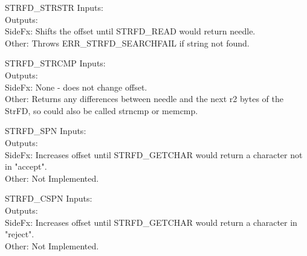 \begin{sccall}{STRFD\_STRSTR}
Inputs: \\
Outputs: \scargs{}\\
SideFx: Shifts the offset until STRFD\_READ would return needle.\\
Other: Throws ERR\_STRFD\_SEARCHFAIL if string not found.
\end{sccall}
\begin{sccall}{STRFD\_STRCMP}
Inputs: \\
Outputs: \\
SideFx: None - does not change offset.\\
Other: Returns any differences between needle and the next r2 bytes of the StrFD, so
could also be called strncmp or memcmp.
\end{sccall}
\begin{sccall}{STRFD\_SPN}
Inputs: \\
Outputs: \scargs{}\\
SideFx: Increases offset until STRFD\_GETCHAR would return a character not in "accept".\\
Other: Not Implemented. \FIXME
\end{sccall}
\begin{sccall}{STRFD\_CSPN}
Inputs: \\
Outputs: \scargs{}\\
SideFx: Increases offset until STRFD\_GETCHAR would return a character in "reject".\\
Other: Not Implemented. \FIXME
\end{sccall}
